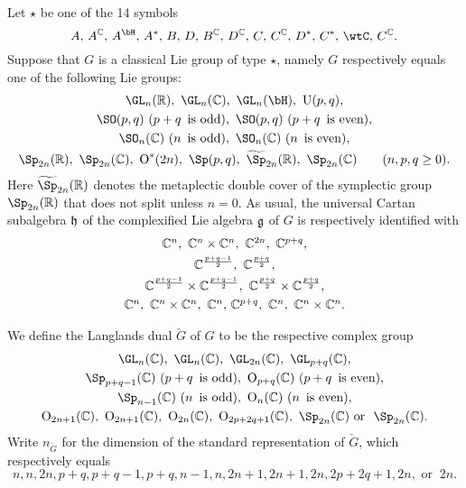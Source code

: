 \documentclass[counting_main.tex]{subfiles}
\begin{document}
Let $\star$ be one of the  14 symbols
\[
\textrm{ $A$, $A^\C$, $A^\bH$, $A^*$, $B$, $D$,   $B^\C$, $D^\C$, $C$, $C^\C$, $D^*$, $C^*$, $\wtC$, $C^\C$. }
\]
Suppose that $G$ is a classical Lie group of type $\star$, namely $G$ respectively equals
one of the following Lie groups:
\[
\begin{array}{c}
   \GL_n(\R), \ \GL_n(\C), \  \GL_n(\bH),\  \oU(p,q),\smallskip\\
    \SO(p,q)\ (p+q\, \textrm{ is odd}),  \  \SO(p,q)\  (p+q\, \textrm{ is even}),\smallskip\\
     \SO_n(\C) \ (n\, \textrm{ is odd}),  \
     \SO_n(\C) \ (n\, \textrm{ is even}),\smallskip \\
     \Sp_{2n}(\R), \ \Sp_{2n}(\C), \  \oO^*(2n), \  \Sp(p,q),\   \widetilde \Sp_{2n}(\R), \ \Sp_{2n}(\C) \qquad (n, p, q\geq 0).
     \end{array}
\]
Here $\widetilde \Sp_{2n}(\R)$ denotes the metaplectic double cover of the symplectic group $\Sp_{2n}(\R)$ that does not split unless $n=0$.
As usual, the universal Cartan subalgebra $\mathfrak h$ of
 the complexified Lie algebra $\mathfrak g$ of $G$ is respectively identified with
\[
\begin{array}{c}
  \C^n, \ \C^n\times \C^n, \ \C^{2n},  \ \C^{p+q},\smallskip \\
\C^{\frac{p+q-1}{2}},\ \C^{\frac{p+q}{2}}, \smallskip \\
\C^{\frac{p+q-1}{2}}\times \C^{\frac{p+q-1}{2}},\  \C^{\frac{p+q}{2}}\times \C^{\frac{p+q}{2}}, \smallskip \\
\C^n,\ \C^n\times \C^n, \ \C^n, \, \C^{p+q},   \ \C^n,\ \C^n\times \C^n.
     \end{array}
\]


We define the Langlands dual $\check G$ of $G$ to be the respective complex group
\[
 \begin{array}{c}
   \GL_n(\C), \ \GL_n(\C), \  \GL_{2n}(\C),\  \GL_{p+q}(\C),\smallskip\\
    \Sp_{p+q-1}(\C)\ (p+q\, \textrm{ is odd}),  \  \oO_{p+q}(\C)\  (p+q\, \textrm{ is even}),\smallskip\\
     \Sp_{n-1}(\C) \ (n\, \textrm{ is odd}),  \
     \oO_n(\C) \ (n\, \textrm{ is even}),\smallskip \\
     \oO_{2n+1}(\C), \ \oO_{2n+1}(\C), \  \oO_{2n}(\C), \  \oO_{2p+2q+1}(\C),\    \Sp_{2n}(\C) \  \textrm{or } \  \Sp_{2n}(\C).
     \end{array}
\]
Write $n_{\check G}$ for the dimension of the standard representation of $\check G$, which respectively equals
\[
 n, n, 2n, p+q, p+q-1, p+q, n-1, n, 2n+1, 2n+1, 2n, 2p+2q+1, 2n, \textrm{ or }\ 2n.
\]
\end{document}
